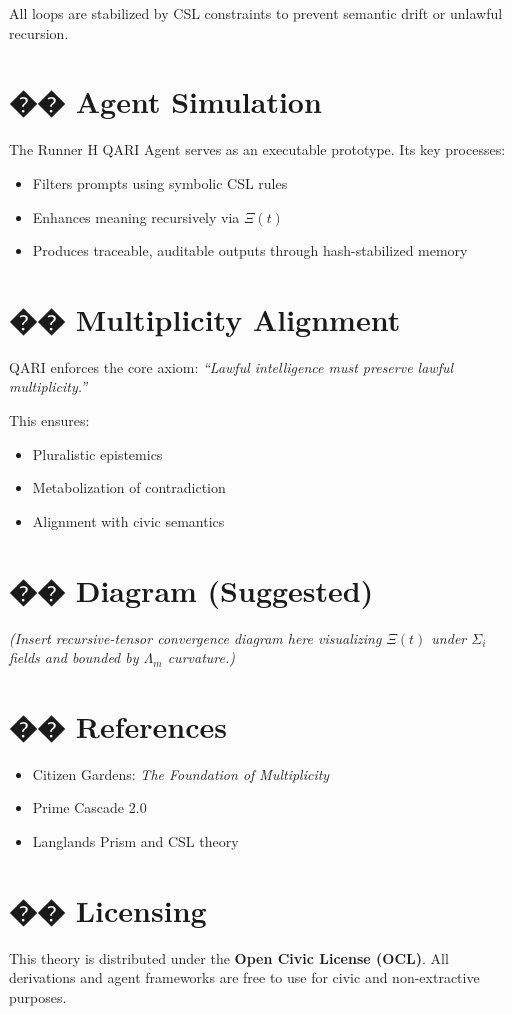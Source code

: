 \documentclass[12pt]{article}
\begin{document}
All loops are stabilized by CSL constraints to prevent semantic drift or unlawful recursion.

\vspace{1em}
\section*{�� Agent Simulation}

The Runner H QARI Agent serves as an executable prototype. Its key processes:

\begin{itemize}
    \item Filters prompts using symbolic CSL rules
    \item Enhances meaning recursively via $\Xi(t)$
    \item Produces traceable, auditable outputs through hash-stabilized memory
\end{itemize}

\vspace{1em}
\section*{�� Multiplicity Alignment}

QARI enforces the core axiom: \textit{``Lawful intelligence must preserve lawful multiplicity.''}

This ensures:
\begin{itemize}
    \item Pluralistic epistemics
    \item Metabolization of contradiction
    \item Alignment with civic semantics
\end{itemize}

\vspace{1em}
\section*{�� Diagram (Suggested)}

\textit{(Insert recursive-tensor convergence diagram here visualizing $\Xi(t)$ under $\Sigma_i$ fields and bounded by $\Lambda_m$ curvature.)}

\vspace{1em}
\section*{�� References}

\begin{itemize}
    \item Citizen Gardens: \textit{The Foundation of Multiplicity}
    \item Prime Cascade 2.0
    \item Langlands Prism and CSL theory
\end{itemize}

\vspace{1em}
\section*{�� Licensing}

This theory is distributed under the \textbf{Open Civic License (OCL)}. All derivations and agent frameworks are free to use for civic and non-extractive purposes.
\end{document}
